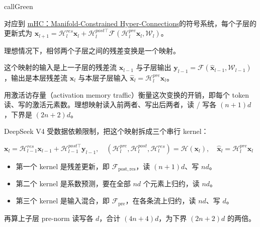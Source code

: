 \documentclass[zihao=false,fontset=windows]{ctexart}
\newcommand{\bigmath}[1]{%
  \begin{center}\large$\displaystyle #1$\end{center}%
}
\begin{document}
\begin{feishubox}{callGreen}{📌}

对应到 \href{https://my.feishu.cn/wiki/WsaawrdO3ifrmTk3ab4cSgjBnRb}{mHC：Manifold-Constrained Hyper-Connections}的符号系统，每个子层的更新式为 $\mathbf{x}_{l+1}=\mathcal{H}_{l}^{res}\mathbf{x}_l+\mathcal{H}_{l}^{post\top}\mathcal{F}(\mathcal{H}_{l}^{pre}\mathbf{x}_l,\mathcal{W}_l)$。\par

理想情况下，相邻两个子层之间的残差变换是一个映射。\par

这个映射的输入是上一子层的残差流 $\mathbf{x}_{l-1}$ 与子层输出 $\mathbf{y}_{l-1}=\mathcal{F}(\hat{\mathbf{x}}_{l-1},\mathcal{W}_{l-1})$，输出是本层残差流 $\mathbf{x}_l$ 与本层子层输入 $\hat{\mathbf{x}}_l=\mathcal{H}_l^{pre}\mathbf{x}_l$。\par

用激活访存量（activation memory traffic）衡量这次变换的开销，即每个 token 读、写的激活元素数。理想映射读入前两者、写出后两者，读 / 写各 $(n+1)d$，下界是 $(2n+2)d$。\par

DeepSeek V4 受数据依赖限制，把这个映射拆成三个串行 kernel：\par

\bigmath{\mathbf{x}_l=\mathcal{H}_{l-1}^{res}\mathbf{x}_{l-1}+\mathcal{H}_{l-1}^{post\top}\mathbf{y}_{l-1},\quad(\mathcal{H}_l^{pre},\mathcal{H}_l^{post},\mathcal{H}_l^{res})=\mathcal{H}(\mathbf{x}_l),\quad\hat{\mathbf{x}}_l=\mathcal{H}_l^{pre}\mathbf{x}_l}
\begin{itemize}
\item 
第一个 kernel 是残差更新，即 $\mathcal{F}_{\mathrm{post},\mathrm{res}}$，读 $(n+1)d$、写 $nd$。\par
\item 
第二个 kernel 是系数预测，要在全部 $nd$ 个元素上归约，读 $nd$。\par
\item 
第三个 kernel 是输入混合，即 $\mathcal{F}_{\mathrm{pre}}$，在各条流上归约，读 $nd$、写 $d$。\par
\end{itemize}

再算上子层 pre-norm 读写各 $d$，合计 $(4n+4)d$，为下界 $(2n+2)d$ 的两倍。\par
\end{feishubox}
\end{document}
